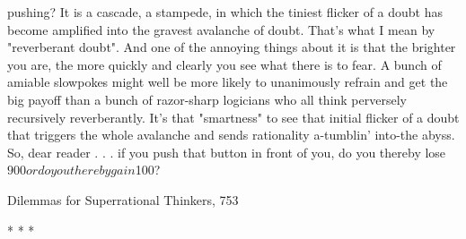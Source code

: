 pushing? It is a cascade, a stampede, in which the tiniest flicker of a doubt has
become amplified into the gravest avalanche of doubt. That's what I mean by
"reverberant doubt". And one of the annoying things about it is that the brighter you
are, the more quickly and clearly you see what there is to fear. A bunch of amiable
slowpokes might well be more likely to unanimously refrain and get the big payoff
than a bunch of razor-sharp logicians who all think perversely recursively
reverberantly. It's that "smartness" to see that initial flicker of a doubt that triggers the
whole avalanche and sends rationality a-tumblin' into-the abyss. So, dear reader . . . if
you push that button in front of you, do you thereby lose $900 or do you thereby gain
$100?




Dilemmas for Superrational Thinkers,                                                    753

                                       *       *      *


